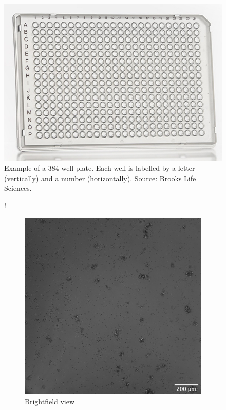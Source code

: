 \begin{figure}[h]
    \centering
    \includegraphics[width=.4\textwidth]{dissertation/figures/384_well.jpg}
    \caption{Example of a 384-well plate. Each well is labelled by a letter (vertically) and a number (horizontally). Source: Brooks Life Sciences.}
    \label{fig:384_well}
\end{figure}

\begin{figure}[h]!
    \centering
    \begin{subfigure}[h!]{0.3\textwidth}
        \includegraphics[width=\textwidth]{dissertation/figures/example_Brightfield_L20.jpg}
        \caption{Brightfield view}
        \label{fig:fov_brightfield}
    \end{subfigure}
    \begin{subfigure}[h!]{0.3\textwidth}

\end{subfigure}
\end{figure}
